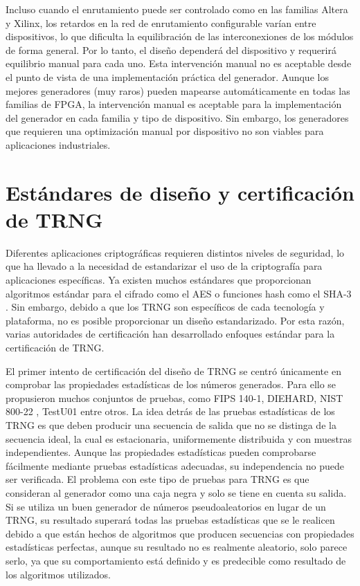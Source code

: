             Incluso cuando el enrutamiento puede ser controlado como en las familias Altera y Xilinx, los retardos en la red de enrutamiento configurable varían entre dispositivos, lo que dificulta la equilibración de las interconexiones de los módulos de forma general. Por lo tanto, el diseño dependerá del dispositivo y requerirá equilibrio manual para cada uno. Esta intervención manual no es aceptable desde el punto de vista de una implementación práctica del generador. Aunque los mejores generadores (muy raros) pueden mapearse automáticamente en todas las familias de FPGA, la intervención manual es aceptable para la implementación del generador en cada familia y tipo de dispositivo. Sin embargo, los generadores que requieren una optimización manual por dispositivo no son viables para aplicaciones industriales.
	
    \section{Estándares de diseño y certificación de TRNG}
	
	
            Diferentes aplicaciones criptográficas requieren distintos niveles de seguridad, lo que ha llevado a la necesidad de estandarizar el uso de la criptografía para aplicaciones específicas. Ya existen muchos estándares que proporcionan algoritmos estándar para el cifrado como el AES \cite{Dworkin2001}  o funciones hash como el SHA-3 \cite{Dang2015}. Sin embargo, debido a que los TRNG son específicos de cada tecnología y plataforma, no es posible proporcionar un diseño estandarizado. Por esta razón, varias autoridades de certificación han desarrollado enfoques estándar para la certificación de TRNG.

            El primer intento de certificación del diseño de TRNG se centró únicamente en comprobar las propiedades estadísticas de los números generados. Para ello se propusieron muchos conjuntos de pruebas, como FIPS 140-1, DIEHARD, NIST 800-22 \cite{Nist2010}, TestU01 entre otros. La idea detrás de las pruebas estadísticas de los TRNG es que deben producir una secuencia de salida que no se distinga de la secuencia ideal, la cual es estacionaria, uniformemente distribuida y con muestras independientes. Aunque las propiedades estadísticas pueden comprobarse fácilmente mediante pruebas estadísticas adecuadas, su independencia no puede ser verificada. El problema con este tipo de pruebas para TRNG es que consideran al generador como una caja negra y solo se tiene en cuenta su salida. Si se utiliza un buen generador de números pseudoaleatorios en lugar de un TRNG, su resultado superará todas las pruebas estadísticas que se le realicen debido a que están hechos de algoritmos que producen secuencias con propiedades estadísticas perfectas, aunque su resultado no es realmente aleatorio, solo parece serlo, ya que su comportamiento está definido y es predecible como resultado de los algoritmos utilizados.

